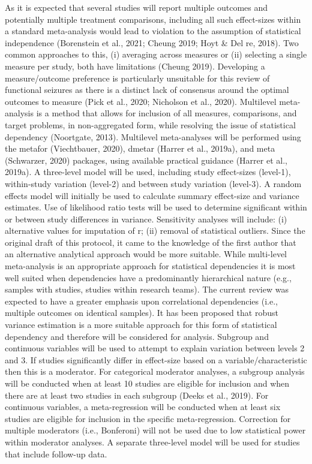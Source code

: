 \documentclass[
  12pt,
  openany]{book}
\begin{document}
As it is expected that several studies will report multiple outcomes and potentially multiple treatment comparisons, including all such effect-sizes within a standard meta-analysis would lead to violation to the assumption of statistical independence (Borenstein et al., 2021; Cheung 2019; Hoyt \& Del re, 2018). Two common approaches to this, (i) averaging across measures or (ii) selecting a single measure per study, both have limitations (Cheung 2019). Developing a measure/outcome preference is particularly unsuitable for this review of functional seizures as there is a distinct lack of consensus around the optimal outcomes to measure (Pick et al., 2020; Nicholson et al., 2020). Multilevel meta-analysis is a method that allows for inclusion of all measures, comparisons, and target problems, in non-aggregated form, while resolving the issue of statistical dependency (Noortgate, 2013). Multilevel meta-analyses will be performed using the metafor (Viechtbauer, 2020), dmetar (Harrer et al., 2019a), and meta (Schwarzer, 2020) packages, using available practical guidance (Harrer et al., 2019a). A three-level model will be used, including study effect-sizes (level-1), within-study variation (level-2) and between study variation (level-3). A random effects model will initially be used to calculate summary effect-size and variance estimates. Use of likelihood ratio tests will be used to determine significant within or between study differences in variance. Sensitivity analyses will include: (i) alternative values for imputation of r; (ii) removal of statistical outliers.
Since the original draft of this protocol, it came to the knowledge of the first author that an alternative analytical approach would be more suitable. While multi-level meta-analysis is an appropriate approach for statistical dependencies it is most well suited when dependencies have a predominantly hierarchical nature (e.g., samples with studies, studies within research teams). The current review was expected to have a greater emphasis upon correlational dependencies (i.e., multiple outcomes on identical samples). It has been proposed that robust variance estimation is a more suitable approach for this form of statistical dependency and therefore will be considered for analysis.
Subgroup and continuous variables will be used to attempt to explain variation between levels 2 and 3. If studies significantly differ in effect-size based on a variable/characteristic then this is a moderator. For categorical moderator analyses, a subgroup analysis will be conducted when at least 10 studies are eligible for inclusion and when there are at least two studies in each subgroup (Deeks et al., 2019). For continuous variables, a meta-regression will be conducted when at least six studies are eligible for inclusion in the specific meta-regression. Correction for multiple moderators (i.e., Bonferoni) will not be used due to low statistical power within moderator analyses. A separate three-level model will be used for studies that include follow-up data.
\end{document}
